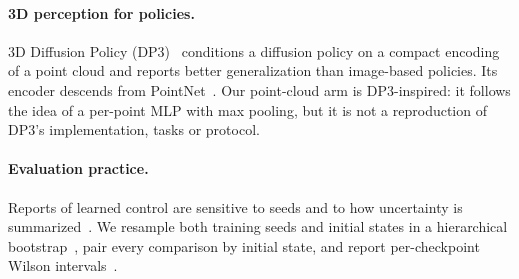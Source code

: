 \paragraph{3D perception for policies.} 3D Diffusion Policy (DP3)~\citep{ze2024dp3}
conditions a diffusion policy on a compact encoding of a point cloud and reports better
generalization than image-based policies. Its encoder descends from
PointNet~\citep{qi2017pointnet}. Our point-cloud arm is DP3-inspired: it follows the idea of
a per-point MLP with max pooling, but it is not a reproduction of DP3's implementation,
tasks or protocol.

\paragraph{Evaluation practice.} Reports of learned control are sensitive to seeds and to
how uncertainty is summarized~\citep{henderson2018matters,agarwal2021precipice}. We
resample both training seeds and initial states in a hierarchical
bootstrap~\citep{efron1979bootstrap,field2007clustered}, pair every comparison by initial
state, and report per-checkpoint Wilson intervals~\citep{wilson1927}.
